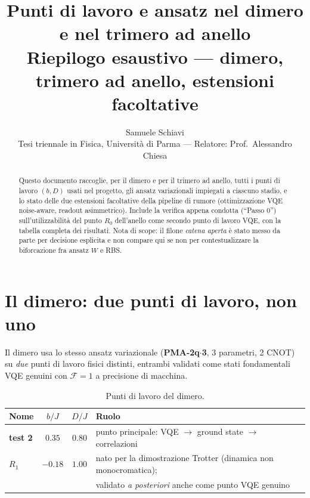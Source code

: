 \documentclass[11pt,a4paper]{article}
\title{\bfseries Punti di lavoro e ansatz nel dimero e nel trimero ad anello\\[2pt]
\large Riepilogo esaustivo --- dimero, trimero ad anello, estensioni facoltative}
\author{Samuele Schiavi \\ \small Tesi triennale in Fisica, Università di Parma
--- Relatore: Prof.\ Alessandro Chiesa}
\date{}
\begin{document}
\maketitle
\thispagestyle{fancy}

\begin{abstract}
\noindent
Questo documento raccoglie, per il dimero e per il trimero ad anello, tutti i
punti di lavoro $(b,D)$ usati nel progetto, gli ansatz variazionali impiegati
a ciascuno stadio, e lo stato delle due estensioni facoltative della pipeline
di rumore (ottimizzazione VQE noise-aware, readout asimmetrico). Include la
verifica appena condotta (``Passo 0'') sull'utilizzabilità del punto $R_0$
dell'anello come secondo punto di lavoro VQE, con la tabella completa dei
risultati. Nota di scope: il filone \emph{catena aperta} è stato messo da
parte per decisione esplicita e non compare qui se non per contestualizzare
la biforcazione fra ansatz $W$ e RBS.
\end{abstract}

\tableofcontents

\section{Il dimero: due punti di lavoro, non uno}

Il dimero usa lo stesso ansatz variazionale (\textbf{PMA-2q$\cdot$3}, 3
parametri, 2 CNOT) su \emph{due} punti di lavoro fisici distinti, entrambi
validati come stati fondamentali VQE genuini con $\mathcal F=1$ a precisione
di macchina.

\begin{table}[htbp]
\centering
\caption{Punti di lavoro del dimero.}
\label{tab:dimero-punti}
\begin{tabular}{lccl}
\toprule
Nome & $b/J$ & $D/J$ & Ruolo \\
\midrule
\textbf{test 2} & $0.35$ & $0.80$ & punto principale: VQE $\to$ ground state
$\to$ correlazioni \\
\textbf{$R_1$} & $-0.18$ & $1.00$ & nato per la dimostrazione Trotter
(dinamica non monocromatica);\\
& & & validato \emph{a posteriori} anche come punto VQE genuino \\
\bottomrule
\end{tabular}
\end{table}
\end{document}
